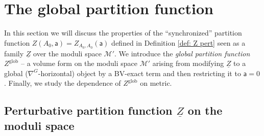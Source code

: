 \documentclass[11pt,a4paper]{amsart}
\theoremstyle{plain} %
\theoremstyle{definition}
\theoremstyle{remark}
\newcommand{\mr}{\mathrm}
\newcommand{\sfa}{\mathsf{a}}
\newcommand{\M}{\mathcal{M}}
\newcommand{\til}{\widetilde}
\newcommand{\mc}{\mathcal}
\newcommand{\ul}{\underline}
\begin{document}
{

\section{The global partition function} \label{sec: global partition function}
In this section we will discuss the properties of the ``synchronized'' partition function $Z(A_0,\sfa) = Z_{A_0,A_0}(\sfa)$ defined in Definition \ref{def: Z pert} seen as a family $\ul{Z}$ over the moduli space $\M'$. We introduce the \emph{global partition function} $Z^\mr{glob}$  %
-- a volume form on the moduli space $\M'$ arising from modifying $\ul{Z}$ to a global ($\nabla^G$-horizontal) object by a BV-exact term and then restricting it to $\sfa=0$. Finally, we study the dependence of $Z^\mr{glob}$ on metric.

\subsection{Perturbative partition function $\ul{Z}$ on the moduli space}
}
\end{document}
